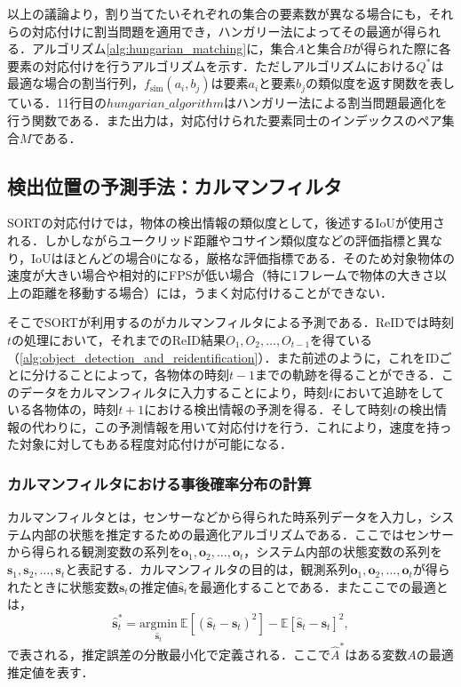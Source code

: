     以上の議論より，割り当てたいそれぞれの集合の要素数が異なる場合にも，それらの対応付けに割当問題を適用でき，ハンガリー法によってその最適が得られる．アルゴリズム\ref{alg:hungarian_matching}に，集合$A$と集合$B$が得られた際に各要素の対応付けを行うアルゴリズムを示す．ただしアルゴリズムにおける$Q^*$は最適な場合の割当行列，$f_{\text{sim}}(a_i, b_j)$は要素$a_i$と要素$b_j$の類似度を返す関数を表している．11行目の$hungarian\_algorithm$はハンガリー法による割当問題最適化を行う関数である．また出力は，対応付けられた要素同士のインデックスのペア集合$M$である．

    \subsection{検出位置の予測手法：カルマンフィルタ}
    \label{subsec:kalman_filter}

    SORT\cite{bewley2016simple}の対応付けでは，物体の検出情報の類似度として，後述するIoUが使用される．しかしながらユークリッド距離やコサイン類似度などの評価指標と異なり，IoUはほとんどの場合$0$になる，厳格な評価指標である．そのため対象物体の速度が大きい場合や相対的にFPSが低い場合（特に1フレームで物体の大きさ以上の距離を移動する場合）には，うまく対応付けることができない．

    そこでSORTが利用するのがカルマンフィルタによる予測である．ReIDでは時刻$t$の処理において，それまでのReID結果$O_1, O_2, \dots, O_{t-1}$を得ている（\ref{alg:object_detection_and_reidentification}）．また前述のように，これをIDごとに分けることによって，各物体の時刻$t-1$までの軌跡を得ることができる．このデータをカルマンフィルタに入力することにより，時刻$t$において追跡をしている各物体の，時刻$t+1$における検出情報の予測を得る．そして時刻$t$の検出情報の代わりに，この予測情報を用いて対応付けを行う．これにより，速度を持った対象に対してもある程度対応付けが可能になる．

        \subsubsection{カルマンフィルタにおける事後確率分布の計算}
        \label{subsubsec:kalmanfilter_setting}

        カルマンフィルタ\cite{bishop2001introduction}とは，センサーなどから得られた時系列データを入力し，システム内部の状態を推定するための最適化アルゴリズムである．ここではセンサーから得られる観測変数の系列を$\bm{o}_1, \bm{o}_2, \dots, \bm{o}_t$，システム内部の状態変数の系列を$\bm{s}_1, \bm{s}_2, \dots, \bm{s}_t$と表記する．カルマンフィルタの目的は，観測系列$\bm{o}_1, \bm{o}_2, \dots, \bm{o}_t$が得られたときに状態変数$\bm{s}_t$の推定値$\hat{\bm{s}}_t$を最適化することである．またここでの最適とは，
        \begin{equation}
            \label{eq:kalman_optimality}
            \hat{\bm{s}}_t^* = \underset{\hat{\bm{s}}_t}{\text{argmin}} ~ \mathbb{E}\left[\left(\hat{\bm{s}}_t - \bm{s}_t\right)^2\right] - \mathbb{E}\left[\hat{\bm{s}}_t - \bm{s}_t\right]^2,
        \end{equation}
        で表される，推定誤差の分散最小化で定義される．ここで$\hat{A}^*$はある変数$A$の最適推定値を表す．

